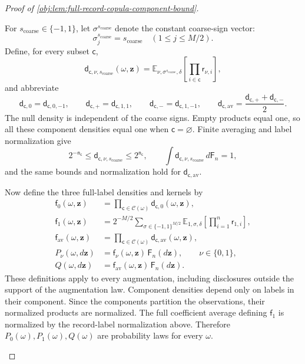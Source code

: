 \documentclass[11pt]{article}
\begin{document}
\begin{proof}[Proof of \cref{obj:lem:full-record-copula-component-bound}]
\begin{enumerate}
For \(s_{\mathrm{coarse}}\in\{-1,1\}\), let
\(\sigma^{s_{\mathrm{coarse}}}\) denote the constant coarse-sign vector:
\[
\sigma^{s_{\mathrm{coarse}}}_j=s_{\mathrm{coarse}}
\quad(1\le j\le M/2).
\]
Define, for every subset \(\mathsf c\),
\[
\mathsf d_{\mathsf c,\nu,s_{\mathrm{coarse}}}
 (\omega,\mathbf z)
 =
 \mathbb E_{\nu,\sigma^{s_{\mathrm{coarse}}},\delta}
 \left[\prod_{i\in\mathsf c}\mathsf r_{\nu,i}\right],
\]
and abbreviate
\[
\mathsf d_{\mathsf c,0}
 =\mathsf d_{\mathsf c,0,-1},
\qquad
\mathsf d_{\mathsf c,+}
 =\mathsf d_{\mathsf c,1,1},
\qquad
\mathsf d_{\mathsf c,-}
 =\mathsf d_{\mathsf c,1,-1},
\qquad
\mathsf d_{\mathsf c,\mathrm{av}}
 =\frac{\mathsf d_{\mathsf c,+}+\mathsf d_{\mathsf c,-}}2.
\]
The null density is independent of the coarse signs. Empty products equal one, so all these component densities equal one when \(\mathsf c=\varnothing\). Finite averaging and label normalization give
\[
2^{-\mathsf n_{\mathsf c}}
 \le\mathsf d_{\mathsf c,\nu,s_{\mathrm{coarse}}}
 \le2^{\mathsf n_{\mathsf c}},
\qquad
\int\mathsf d_{\mathsf c,\nu,s_{\mathrm{coarse}}}\,d\mathsf F_n=1,
\]
and the same bounds and normalization hold for
\(\mathsf d_{\mathsf c,\mathrm{av}}\).

Now define the three full-label densities and kernels by
\[
\begin{aligned}
\mathsf f_0(\omega,\mathbf z)
 &=\prod_{\mathsf c\in\mathscr C(\omega)}
       \mathsf d_{\mathsf c,0}(\omega,\mathbf z),\\
\mathsf f_1(\omega,\mathbf z)
 &=2^{-M/2}\sum_{\sigma\in\{-1,1\}^{M/2}}
   \mathbb E_{1,\sigma,\delta}
       \left[\prod_{i=1}^n\mathsf r_{1,i}\right],\\
\mathsf f_{\mathrm{av}}(\omega,\mathbf z)
 &=\prod_{\mathsf c\in\mathscr C(\omega)}
       \mathsf d_{\mathsf c,\mathrm{av}}(\omega,\mathbf z),\\
P_\nu(\omega,d\mathbf z)
 &=\mathsf f_\nu(\omega,\mathbf z)\,\mathsf F_n(d\mathbf z),
 \qquad \nu\in\{0,1\},\\
Q(\omega,d\mathbf z)
 &=\mathsf f_{\mathrm{av}}(\omega,\mathbf z)\,
       \mathsf F_n(d\mathbf z).
\end{aligned}
\]
These definitions apply to every augmentation, including disclosures outside the support of the augmentation law. Component densities depend only on labels in their component. Since the components partition the observations, their normalized products are normalized. The full coefficient average defining \(\mathsf f_1\) is normalized by the record-label normalization above. Therefore \(P_0(\omega),P_1(\omega),Q(\omega)\) are probability laws for every \(\omega\).


\end{enumerate}
\end{proof}
\end{document}
